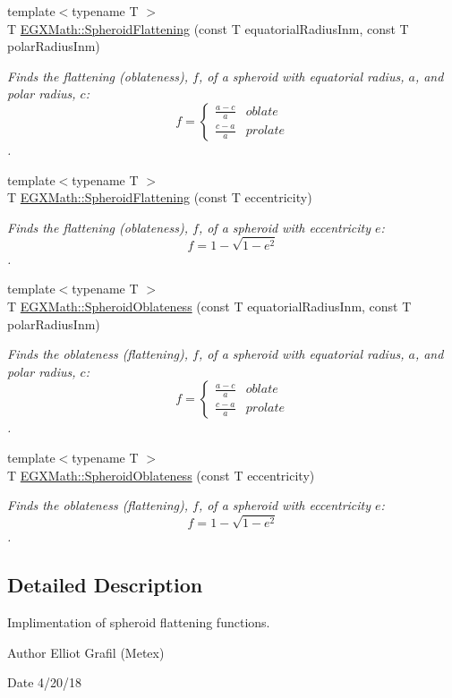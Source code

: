 \begin{DoxyCompactItemize}
\item 
{\footnotesize template$<$typename T $>$ }\\T \mbox{\hyperlink{group___e_g_x_math-_geometry-3_d-_spheroid-_flattening_ga05e3be91f5f7fbaa9371687aa3834179}{E\+G\+X\+Math\+::\+Spheroid\+Flattening}} (const T equatorial\+Radius\+Inm, const T polar\+Radius\+Inm)
\begin{DoxyCompactList}\small\item\em Finds the flattening (oblateness), $f$, of a spheroid with equatorial radius, $a$, and polar radius, $c$\+: \[ f =\begin{cases} \frac{a-c}{a}{} & oblate \\ \frac{c-a}{a} & prolate \end{cases} \]. \end{DoxyCompactList}\item 
{\footnotesize template$<$typename T $>$ }\\T \mbox{\hyperlink{group___e_g_x_math-_geometry-3_d-_spheroid-_flattening_ga9822b6e1025edbf7d272949547c53511}{E\+G\+X\+Math\+::\+Spheroid\+Flattening}} (const T eccentricity)
\begin{DoxyCompactList}\small\item\em Finds the flattening (oblateness), $f$, of a spheroid with eccentricity $e$\+: \[ f = 1 - \sqrt{1-e^2} \]. \end{DoxyCompactList}\item 
{\footnotesize template$<$typename T $>$ }\\T \mbox{\hyperlink{group___e_g_x_math-_geometry-3_d-_spheroid-_flattening_ga9769747e144e2209b7927632b854c31f}{E\+G\+X\+Math\+::\+Spheroid\+Oblateness}} (const T equatorial\+Radius\+Inm, const T polar\+Radius\+Inm)
\begin{DoxyCompactList}\small\item\em Finds the oblateness (flattening), $f$, of a spheroid with equatorial radius, $a$, and polar radius, $c$\+: \[ f =\begin{cases} \frac{a-c}{a}{} & oblate \\ \frac{c-a}{a} & prolate \end{cases} \]. \end{DoxyCompactList}\item 
{\footnotesize template$<$typename T $>$ }\\T \mbox{\hyperlink{group___e_g_x_math-_geometry-3_d-_spheroid-_flattening_ga486adfc58b047197daf87f50b2039ca7}{E\+G\+X\+Math\+::\+Spheroid\+Oblateness}} (const T eccentricity)
\begin{DoxyCompactList}\small\item\em Finds the oblateness (flattening), $f$, of a spheroid with eccentricity $e$\+: \[ f = 1 - \sqrt{1-e^2} \]. \end{DoxyCompactList}\end{DoxyCompactItemize}


\subsection{Detailed Description}
Implimentation of spheroid flattening functions. 

\begin{DoxyAuthor}{Author}
Elliot Grafil (Metex) 
\end{DoxyAuthor}
\begin{DoxyDate}{Date}
4/20/18 
\end{DoxyDate}
